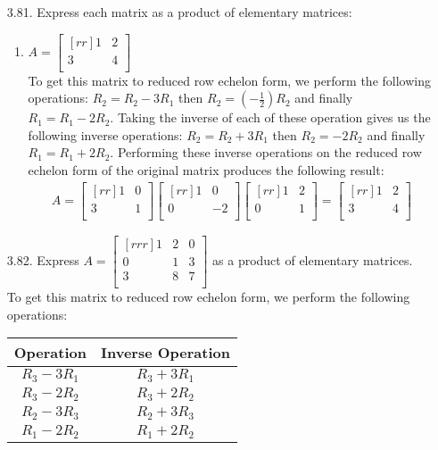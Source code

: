 \documentclass[12pt]{article}
\begin{document}
\begin{enumerate}
\item [3.81.] Express each matrix as a product of elementary matrices:
	\begin{enumerate}
	\item $A= \begin{bmatrix}[rr] 1 & 2\\ 3 & 4\\ \end{bmatrix}$\\
	To get this matrix to reduced row echelon form, we perform the following operations: $R_2 = R_2 - 3R_1$ then $R_2 = (-\frac{1}{2})R_2$ and finally $R_1 = R_1 - 2R_2$. Taking the inverse of each of these operation gives us the following inverse operations: $R_2 = R_2 + 3R_1$ then $R_2 = -2R_2$ and finally $R_1 = R_1+ 2R_2$. Performing these inverse operations on the reduced row echelon form of the original matrix produces the following result:
	\begin{align*}
	A= \begin{bmatrix}[rr] 1 & 0\\ 3 & 1\\ \end{bmatrix}
	\begin{bmatrix}[rr] 1 & 0\\ 0 & -2\\ \end{bmatrix}
	\begin{bmatrix}[rr] 1 & 2\\ 0 & 1\\ \end{bmatrix}
	= \begin{bmatrix}[rr] 1 & 2\\ 3 & 4\\ \end{bmatrix}
	\end{align*}
	\end{enumerate}

\item [3.82.] Express $A= \begin{bmatrix}[rrr] 1 & 2 & 0\\ 0 & 1 & 3\\ 3 & 8 & 7\\ \end{bmatrix}$ as a product of elementary matrices.\\
	To get this matrix to reduced row echelon form, we perform the following operations:
	\begin{center}
	\begin{tabular}{ c | c }
	Operation & Inverse Operation\\
	\hline
	$R_3-3R_1$ & $R_3 + 3R_1$\\
	$R_3-2R_2$ & $R_3 + 2R_2$\\
	$R_2-3R_3$ & $R_2 + 3R_3$\\
	$R_1-2R_2$ & $R_1 + 2R_2$\\
	\end{tabular}
	\end{center}
	

\end{enumerate}
\end{document}
